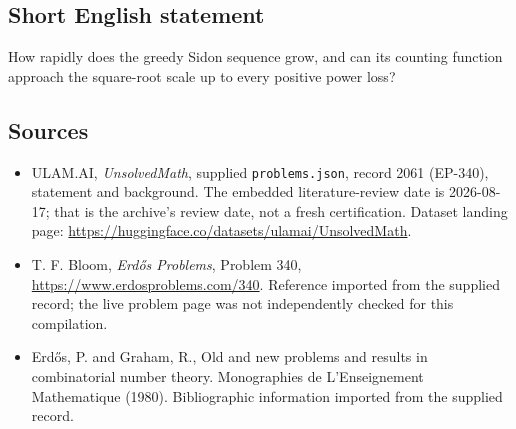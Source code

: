 \documentclass[11pt,a4paper]{article}
\begin{document}
\subsection{Short English statement}

How rapidly does the greedy Sidon sequence grow, and can its counting function approach the square-root scale up to every positive power loss?

\subsection{Sources}

{\small

\begin{itemize}

\item[\hypertarget{source:2061:1}{S1}] ULAM.AI, \emph{UnsolvedMath}, supplied \texttt{problems.json}, record 2061 (EP-340), statement and background. The embedded literature-review date is 2026-08-17; that is the archive’s review date, not a fresh certification. Dataset landing page: \url{https://huggingface.co/datasets/ulamai/UnsolvedMath}.

\item[\hypertarget{source:2061:2}{S2}] T. F. Bloom, \emph{Erdős Problems}, Problem 340, \url{https://www.erdosproblems.com/340}. Reference imported from the supplied record; the live problem page was not independently checked for this compilation.

\item[\hypertarget{source:2061:3}{S3}] Erd\H{o}s, P. and Graham, R., Old and new problems and results in combinatorial number theory. Monographies de L'Enseignement Mathematique (1980). Bibliographic information imported from the supplied record.

\end{itemize}

}

\label{end:2061}
\end{document}

